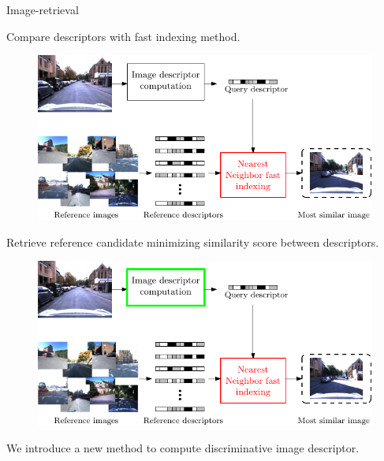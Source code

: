 \begin{frame}{Image-retrieval}
{\begin{figure}[t]
	\end{figure}
	\vfill	
	Compare descriptors with fast indexing method.
	}
	{
	\begin{figure}[t]
		\centering
		\includegraphics[width=0.8\linewidth]{vect/intro/fig3/4}
	\end{figure}
	\vfill	
	Retrieve reference candidate minimizing similarity score between descriptors.
	}
	{
	\begin{figure}[t]
		\centering
		\includegraphics[width=0.8\linewidth]{vect/intro/fig3/5}
	\end{figure}
	\vfill	
	
	We introduce a new method to compute discriminative image descriptor.
	}
\end{frame}

